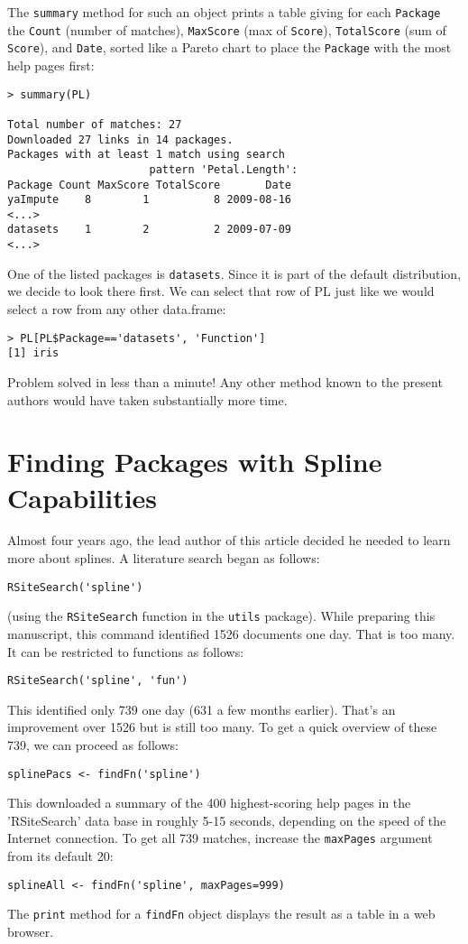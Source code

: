 The {\tt summary} method for such an object prints a table giving
for each {\tt Package} the {\tt Count} (number of matches),
{\tt MaxScore} (max of {\tt Score}), {\tt TotalScore} (sum of
{\tt Score}), and {\tt Date}, sorted like a Pareto chart to place
the {\tt Package} with the most help pages first:
\begin{verbatim}
> summary(PL)

Total number of matches: 27
Downloaded 27 links in 14 packages.
Packages with at least 1 match using search
                      pattern 'Petal.Length':
Package Count MaxScore TotalScore       Date
yaImpute    8        1          8 2009-08-16
<...>
datasets    1        2          2 2009-07-09
<...>
\end{verbatim}
One of the listed packages is {\tt datasets}.  Since it is part of the
default \R{} distribution, we decide to look there first.  We can
select that row of PL just like we would select a row from any other
data.frame:
\begin{verbatim}
> PL[PL$Package=='datasets', 'Function']
[1] iris
\end{verbatim}
Problem solved in less than a minute!  Any other method known
to the present authors would have taken substantially more time.

\section*{Finding Packages with Spline Capabilities}

Almost four years ago, the lead author of this article decided he
needed to learn more about splines.  A literature search
began as follows:
\begin{verbatim}
RSiteSearch('spline')
\end{verbatim}
(using the {\tt RSiteSearch} function in the {\tt utils} package).
While preparing this manuscript, this command identified
1526 documents one day.  That is too many.  It can be
restricted to functions as follows:
\begin{verbatim}
RSiteSearch('spline', 'fun')
\end{verbatim}
This identified only 739 one day (631 a few months earlier).
That's an improvement over 1526 but is still too many.
To get a quick overview of these 739, we can proceed
as follows:
\begin{verbatim}
splinePacs <- findFn('spline')
\end{verbatim}
This downloaded a summary of the 400 highest-scoring help pages
in the 'RSiteSearch' data base in roughly 5-15 seconds, depending
on the speed of the Internet connection.  To get all 739 matches,
increase the {\tt maxPages} argument from its default 20:
\begin{verbatim}
splineAll <- findFn('spline', maxPages=999)
\end{verbatim}
The {\tt print} method for a {\tt findFn} object displays the
result as a table in a web browser.


